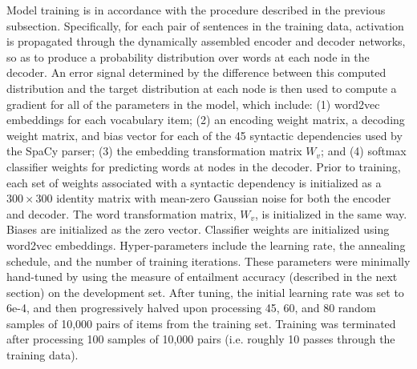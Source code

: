 \documentclass[utf8]{frontiersSCNS} %
\begin{document}
Model training is in accordance with the procedure described in the previous subsection. Specifically, for each pair of sentences in the training data, activation is propagated through the dynamically assembled encoder and decoder networks, so as to produce a probability distribution over words at each node in the decoder. An error signal determined by the difference between this computed distribution and the target distribution at each node is then used to compute a gradient for all of the parameters in the model, which include: (1) word2vec embeddings for each vocabulary item; (2) an encoding weight matrix, a decoding weight matrix, and bias vector for each of the 45 syntactic dependencies used by the SpaCy parser; (3) the embedding transformation matrix $W_v$; and (4) softmax classifier weights for predicting words at nodes in the decoder. Prior to training, each set of weights associated with a syntactic dependency is initialized as a $300 \times 300$ identity matrix with mean-zero Gaussian noise for both the encoder and decoder. The word transformation matrix, $W_v$, is initialized in the same way. Biases are initialized as the zero vector. Classifier weights are initialized using word2vec embeddings. Hyper-parameters include the learning rate, the annealing schedule, and the number of training iterations. These parameters were minimally hand-tuned by using the measure of entailment accuracy (described in the next section) on the development set. After tuning, the initial learning rate was set to 6e-4, and then progressively halved upon processing 45, 60, and 80 random samples of 10,000 pairs of items from the training set. Training was terminated after processing 100 samples of 10,000 pairs (i.e. roughly 10 passes through the training data).        
\end{document}
